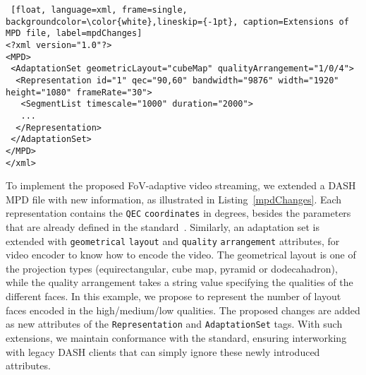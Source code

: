 \begin{lstlisting} [float, language=xml, frame=single, backgroundcolor=\color{white},lineskip={-1pt}, caption=Extensions of MPD file, label=mpdChanges]
<?xml version="1.0"?>
<MPD>
 <AdaptationSet geometricLayout="cubeMap" qualityArrangement="1/0/4">
  <Representation id="1" qec="90,60" bandwidth="9876" width="1920" height="1080" frameRate="30">
   <SegmentList timescale="1000" duration="2000">
   ...
  </Representation>
 </AdaptationSet>
</MPD>
</xml>
\end{lstlisting}

 To implement the proposed
\ac{FoV}-adaptive video streaming, we extended a \ac{DASH} \ac{MPD}
file with new information, as illustrated in Listing~\ref{mpdChanges}.
Each representation contains the \texttt{\ac{QEC}}
\texttt{coordinates} in degrees, besides the parameters that are
already defined in the standard~\cite{iso_iec}. Similarly, an
adaptation set is extended with \texttt{geometrical} \texttt{layout}
and \texttt{quality} \texttt{arrangement} attributes, for video
encoder to know how to encode the video. The geometrical layout is one
of the projection types (equirectangular, cube map, pyramid or
dodecahadron), while the quality arrangement takes a string value
specifying the qualities of the different faces. In this example, we
propose to represent the number of layout faces encoded in the
high/medium/low qualities. The proposed changes are added as new
attributes of the \texttt{Representation} and \texttt{AdaptationSet}
tags. With such extensions, we maintain conformance with the standard,
ensuring interworking with legacy \ac{DASH} clients that can simply
ignore these newly introduced attributes.
